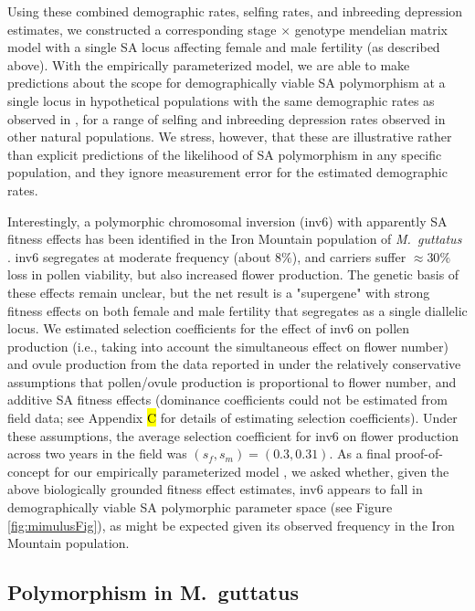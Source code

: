 \documentclass[11pt,draft]{article}
\begin{document}
Using these combined demographic rates, selfing rates, and inbreeding depression estimates, we constructed a corresponding stage $\times$ genotype mendelian matrix model with a single SA locus affecting female and male fertility (as described above). With the empirically parameterized model, we are able to make predictions about the scope for demographically viable SA polymorphism at a single locus in hypothetical populations with the same demographic rates as observed in \citet{PetersonEtAl2016}, for a range of selfing and inbreeding depression rates observed in other natural populations. We stress, however, that these are illustrative rather than explicit predictions of the likelihood of SA polymorphism in any specific population, and they ignore measurement error for the estimated demographic rates.

Interestingly, a polymorphic chromosomal inversion (inv6) with apparently SA fitness effects has been identified in the Iron Mountain population of {\itshape M.~guttatus} \citep{LeeKelly2015}. inv6 segregates at moderate frequency (about $8\%$), and carriers suffer $\approx 30 \%$ loss in pollen viability, but also increased flower production. The genetic basis of these effects remain unclear, but the net result is a "supergene" with strong fitness effects on both female and male fertility that segregates as a single diallelic locus. We estimated selection coefficients for the effect of inv6 on pollen production (i.e., taking into account the simultaneous effect on flower number) and ovule production from the data reported in \citet{LeeKelly2015} under the relatively conservative assumptions that pollen/ovule production is proportional to flower number, and  additive SA fitness effects (dominance coefficients could not be estimated from field data; see Appendix \hl{C} for details of estimating selection coefficients). Under these assumptions, the average selection coefficient for inv6 on flower production across two years in the field was $(s_f,s_m) = (0.3,0.31)$. As a final proof-of-concept for our empirically parameterized model \citep[e.g.,][]{Servedio2014}, we asked whether, given the above biologically grounded fitness effect estimates, inv6 appears to fall in demographically viable SA polymorphic parameter space (see Figure \ref{fig:mimulusFig}), as might be expected given its observed frequency in the Iron Mountain population.


\subsection*{Polymorphism in M.~guttatus} \label{sec:Mgutt}
\end{document}
